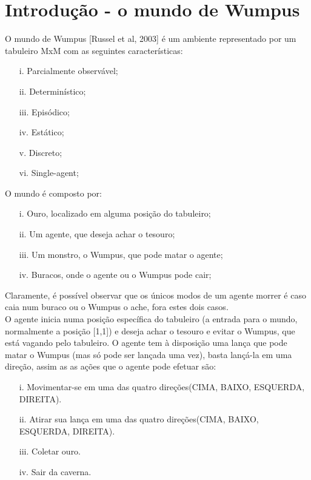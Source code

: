 \documentclass[11pt,reqno]{article}
\begin{document}
\section{Introdução - o mundo de Wumpus}

O mundo de Wumpus [Russel et al, 2003] é um ambiente representado por um tabuleiro MxM com as seguintes características:
\begin{itemize}
\item[i.] Parcialmente observável;
\item[ii.] Determinístico;
\item[iii.] Episódico;
\item[iv.] Estático;
\item[v.] Discreto;
\item[vi.] Single-agent;
\end{itemize}


O mundo é composto por:

\begin{itemize}
\item[i.] Ouro, localizado em alguma posição do tabuleiro;
\item[ii.] Um agente, que deseja achar o tesouro;
\item[iii.] Um monstro, o Wumpus, que pode matar o agente;
\item[iv.] Buracos, onde o agente ou o Wumpus pode cair;
\end{itemize}

Claramente, é possível observar que os únicos modos de um agente morrer é caso caia num buraco ou o Wumpus o ache, fora estes dois casos.\\
O agente inicia numa posição específica do tabuleiro (a entrada para o mundo, normalmente a posição [1,1]) e deseja achar o tesouro e evitar o Wumpus, que está vagando pelo tabuleiro.
O agente tem à disposição uma lança que pode matar o Wumpus (mas só pode ser lançada uma vez), basta lançá-la em uma direção, assim as as ações que o agente pode efetuar são:

\begin{itemize}
\item[i.] Movimentar-se em uma das quatro direções(CIMA, BAIXO, ESQUERDA, DIREITA).
\item[ii.] Atirar sua lança em uma das quatro direções(CIMA, BAIXO, ESQUERDA, DIREITA).
\item[iii.] Coletar ouro.
\item[iv.] Sair da caverna.
\end{itemize}
\end{document}
